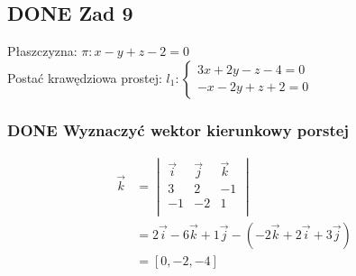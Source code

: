 \documentclass[11pt]{article}
\begin{document}
\subsection{{\bfseries\sffamily DONE} Zad 9}
\label{sec:org9609595}
Płaszczyzna: \(\pi : x - y + z - 2 = 0\)
\\\empty
Postać krawędziowa prostej:
\(l_1 : \begin{cases}
3x + 2y - z - 4 = 0\\
-x - 2y + z + 2 = 0
\end{cases}\)
\subsubsection{{\bfseries\sffamily DONE} Wyznaczyć wektor kierunkowy porstej}
\label{sec:org84c1ec6}
\begin{align*}
  \vec k &= \begin{vmatrix}
              \vec i & \vec j & \vec k\\
              3 & 2 & -1 \\
              -1 & -2 & 1\\
            \end{vmatrix}
  \\
         &= 2 \vec i - 6 \vec k + 1 \vec j - (-2 \vec k + 2 \vec i + 3 \vec j)
  \\
         &= [0, -2, -4]
\end{align*}
\end{document}
